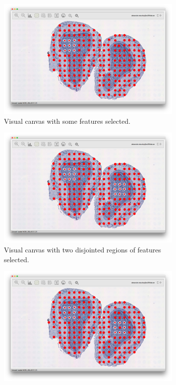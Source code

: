 \documentclass[10pt,a4paper,titlepage]{book}
\begin{document}
\begin{figure}[h]
	\centering
	\begin{subfigure}{0.3\linewidth}
		\includegraphics[width=\linewidth]{./Pictures/default_selection}
		\caption{Visual canvas with some features selected.}
		\label{fig:default_selection}
	\end{subfigure}
	\begin{subfigure}{0.3\linewidth}
		\includegraphics[width=\linewidth]{./Pictures/double_selection}
		\caption{Visual canvas with two disjointed regions of features selected.}
		\label{fig:double_selection}
	\end{subfigure}
	\begin{subfigure}{0.3\linewidth}
		\includegraphics[width=\linewidth]{./Pictures/selective_selection}

\end{subfigure}
\end{figure}
\end{document}
